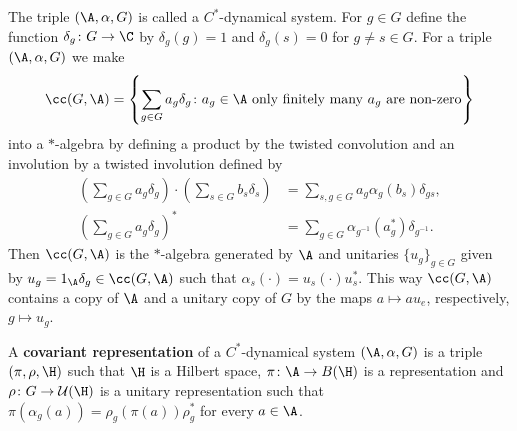 The triple $(\A, \alpha,G)$ is called a $C^*$-dynamical system. For $g \in G$ define the function $\delta_g \colon G \to \C$ by $\delta_g(g)=1$ and $\delta_g(s)=0$ for $g \neq s \in G$.
For a triple $(\A,\alpha,G)$ we make 
\begin{align*}
\cc(G,\A)=\left\{\sum_{g \in G}a_{g}\delta_{g} \colon a_{g} \in \A\ \text{only
finitely many $a_{g}$ are non-zero}\right\}
\end{align*}
into a $*$-algebra by defining a product by the twisted convolution and an involution by a twisted involution defined by
\begin{align*}
\left(\sum_{g \in G}a_{g}\delta_{g} \right) \cdot \left( \sum_{s \in G}b_{s}\delta_{s}\right) &= \sum_{s,g \in G} a_{g} \alpha_{g}(b_{s})\delta_{gs}, \\ \left(\sum_{g \in G}a_{g}\delta_{g}\right)^*&=\sum_{g \in G}\alpha_{g^{-1}}(a_{g}^*)\delta_{g^{-1}}.
\end{align*}
Then $\cc(G,\A)$ is the $*$-algebra generated by $\A$ and unitaries $\{u_{g} \}_{g \in G}$  given by $u_{g}=1_{\A} \delta_{g} \in \cc(G,\A)$ such that $\alpha_{s}(\cdot)=u_{s}(\cdot)u_{s}^*$. This way $\cc(G,\A)$ contains a copy of $\A$ and a unitary copy of $G$ by the maps $a \mapsto a u_{e}$, respectively, $g \mapsto u_{g}$. 

\begin{definition}
A \textbf{covariant representation} of a $C^*$-dynamical system
$(\A,\alpha,G)$ is a triple $(\pi,\rho,\H)$ such that $\H$ is a Hilbert space,
$\pi \colon \A \to B(\H)$ is a representation and $\rho \colon G \to
\mathcal{U}(\H)$ is a unitary representation such that $\pi(
\alpha_{g}(a))=\rho_{g}(\pi(a))\rho_{g}^*$ for every $a \in \A$. 
\end{definition}

